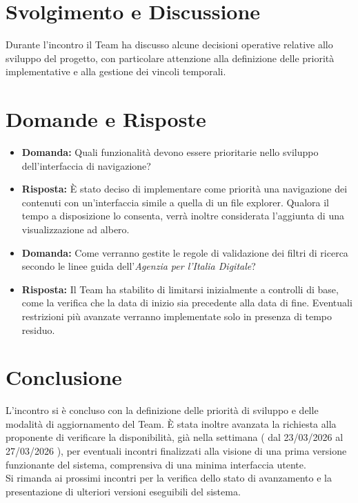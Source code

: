 \documentclass[a4paper,12pt]{article}
\begin{document}
\vspace{0.5cm}

\section{Svolgimento e Discussione}

Durante l'incontro il Team ha discusso alcune decisioni operative relative allo sviluppo del progetto, con particolare attenzione 
alla definizione delle priorità implementative e alla gestione dei vincoli temporali.

\section{Domande e Risposte}

\begin{itemize}
    \item \textbf{Domanda:} Quali funzionalità devono essere prioritarie nello sviluppo dell'interfaccia di navigazione?
    \item \textbf{Risposta:} È stato deciso di implementare come priorità una navigazione dei contenuti con un'interfaccia simile 
    a quella di un file explorer. Qualora il tempo a disposizione lo consenta, verrà inoltre considerata l'aggiunta di una visualizzazione ad albero.
    \item \textbf{Domanda:} Come verranno gestite le regole di validazione dei filtri di ricerca secondo le linee guida dell'\textit{Agenzia per l'Italia Digitale}?
    \item \textbf{Risposta:} Il Team ha stabilito di limitarsi inizialmente a controlli di base, come la verifica che la data 
    di inizio sia precedente alla data di fine. Eventuali restrizioni più avanzate verranno implementate solo in presenza di tempo residuo.
\end{itemize}

\section{Conclusione}

L'incontro si è concluso con la definizione delle priorità di sviluppo e delle modalità di aggiornamento del Team. È stata inoltre avanzata la richiesta 
alla proponente di verificare la disponibilità, già nella settimana ( dal 23/03/2026 al 27/03/2026 ), per eventuali incontri finalizzati alla visione di una 
prima versione funzionante del sistema, comprensiva di una minima interfaccia utente. 
\\Si rimanda ai prossimi incontri per la verifica dello stato di 
avanzamento e la presentazione di ulteriori versioni eseguibili del sistema.
\end{document}
